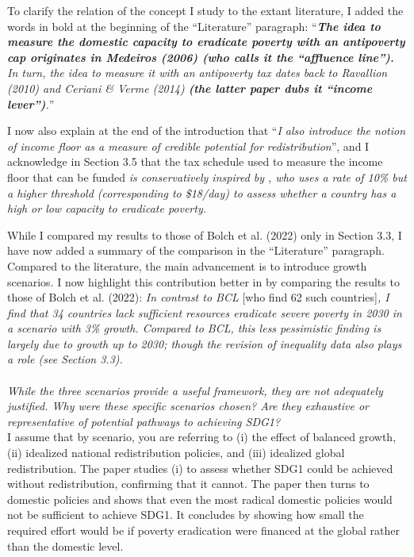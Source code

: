 \documentclass[12pt,english]{article}
\begin{document}
To clarify the relation of the concept I study to the extant literature, I added the words in bold at the beginning of the ``Literature'' paragraph: ``\textit{\textbf{The idea to measure the domestic capacity to eradicate poverty with an antipoverty cap originates in Medeiros (2006) (who calls it the ``affluence line'').} In turn, the idea to measure it with an antipoverty tax dates back to Ravallion (2010) and Ceriani \& Verme (2014) \textbf{(the latter paper dubs it ``income lever'')}.}''

I now also explain at the end of the introduction that ``\textit{I also introduce the notion of \textit{income floor} as a measure of credible potential for redistribution}'', and I acknowledge in Section 3.5 that the tax schedule used to measure the income floor that can be funded \textit{is conservatively inspired by \cite{ravallion_poorer_2010}, who uses a rate of 10\% but a higher threshold (corresponding to \$18/day) to assess whether a country has a high or low capacity to eradicate poverty.}

While I compared my results to those of Bolch et al. (2022) only in Section 3.3, I have now added a summary of the comparison in the ``Literature'' paragraph. 
Compared to the literature, the main advancement is to introduce growth scenarios. I now highlight this contribution better in by comparing the results to those of Bolch et al. (2022): 
\textit{In contrast to BCL} [who find 62 such countries]\textit{, I find that 34 countries lack sufficient resources eradicate severe poverty in 2030 in a scenario with 3\% growth. Compared to BCL, this less pessimistic finding is largely due to growth up to 2030; though the revision of inequality data also plays a role (see Section 3.3). }
~\\ ~\\

\textit{While the three scenarios provide a useful framework, they are not adequately justified. Why were these specific scenarios chosen? Are they exhaustive or representative of potential pathways to achieving SDG1? }~\\

I assume that by scenario, you are referring to (i) the effect of balanced growth, (ii) idealized national redistribution policies, and (iii) idealized global redistribution. The paper studies (i) to assess whether SDG1 could be achieved without redistribution, confirming that it cannot. The paper then turns to domestic policies and shows that even the most radical domestic policies would not be sufficient to achieve SDG1. It concludes by showing how small the required effort would be if poverty eradication were financed at the global rather than the domestic level. 
\end{document}
